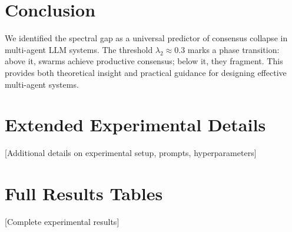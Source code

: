 \documentclass[10pt]{article}
\begin{document}
\section{Conclusion}

We identified the spectral gap as a universal predictor of consensus collapse in multi-agent LLM systems. The threshold $\lambda_2 \approx 0.3$ marks a phase transition: above it, swarms achieve productive consensus; below it, they fragment. This provides both theoretical insight and practical guidance for designing effective multi-agent systems.




\appendix
\section{Extended Experimental Details}

[Additional details on experimental setup, prompts, hyperparameters]

\section{Full Results Tables}

[Complete experimental results]
\end{document}
